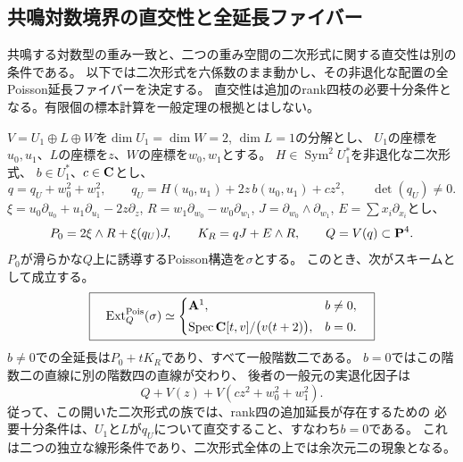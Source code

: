 \subsection{共鳴対数境界の直交性と全延長ファイバー}
\label{subsec:quadric-log-block-orthogonality}
共鳴する対数型の重み一致と、二つの重み空間の二次形式に関する直交性は別の条件である。
以下では二次形式を六係数のまま動かし、その非退化な配置の全Poisson延長ファイバーを決定する。
直交性は追加のrank四枝の必要十分条件となる。有限個の標本計算を一般定理の根拠とはしない。

\begin{theorem}[共鳴Log型の二次形式に関する直交性判定]
\label{thm:quadric-log-block-orthogonality}
$V=U_1\oplus L\oplus W$を$\dim U_1=\dim W=2$, $\dim L=1$の分解とし、
$U_1$の座標を$u_0,u_1$、$L$の座標を$z$、$W$の座標を$w_0,w_1$とする。
$H\in\operatorname{Sym}^2U_1^*$を非退化な二次形式、
$b\in U_1^*$、$c\in\mathbf C$とし、
\[
 q=q_U+w_0^2+w_1^2,\qquad
 q_U=H(u_0,u_1)+2z\,b(u_0,u_1)+cz^2,
 \qquad\det(q_U)\ne0.
\]
$\xi=u_0\partial_{u_0}+u_1\partial_{u_1}-2z\partial_z$,
$R=w_1\partial_{w_0}-w_0\partial_{w_1}$,
$J=\partial_{w_0}\wedge\partial_{w_1}$,
$E=\sum x_i\partial_{x_i}$とし、
\[
 P_0=2\xi\wedge R+\xi(q_U)J,\qquad
 K_R=qJ+E\wedge R,\qquad Q=V(q)\subset\mathbf P^4.
\]
$P_0$が滑らかな$Q$上に誘導するPoisson構造を$\sigma$とする。
このとき、次がスキームとして成立する。
\[
 \boxed{\quad
 \operatorname{Ext}^{\mathrm{Pois}}_Q(\sigma)\simeq
 \begin{cases}
 \mathbf A^1,&b\ne0,\\[1mm]
 \operatorname{Spec}\mathbf C[t,v]/\bigl(v(t+2)\bigr),&b=0.
 \end{cases}\quad}
\]
$b\ne0$での全延長は$P_0+tK_R$であり、すべて一般階数二である。
$b=0$ではこの階数二の直線に別の階数四の直線が交わり、
後者の一般元の実退化因子は
\[
 Q+V(z)+V(cz^2+w_0^2+w_1^2).
\]
従って、この開いた二次形式の族では、rank四の追加延長が存在するための
必要十分条件は、$U_1$と$L$が$q_U$について直交すること、すなわち$b=0$である。
これは二つの独立な線形条件であり、二次形式全体の上では余次元二の現象となる。
\end{theorem}
